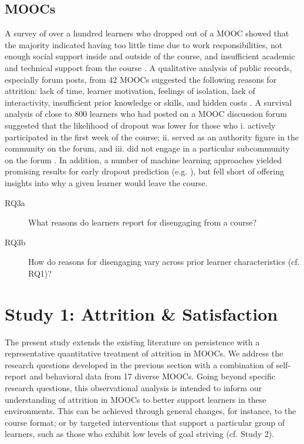 \documentclass{sigchi}\usepackage[]{graphicx}\usepackage[]{color}
\begin{document}
\subsection{MOOCs}

A survey of over a hundred learners who dropped out of a MOOC showed that the majority indicated having too little time due to work responsibilities, not enough social support inside and outside of the course, and insufficient academic and technical support from the course \cite{gutl2014attrition}. A qualitative analysis of public records, especially forum posts, from 42 MOOCs suggested the following reasons for attrition: lack of time, learner motivation, feelings of isolation, lack of interactivity, insufficient prior knowledge or skills, and hidden costs \cite{khalil2014moocs}. A survival analysis of close to 800 learners who had posted on a MOOC discussion forum suggested that the likelihood of dropout was lower for those who i. actively participated in the first week of the course; ii. served as an authority figure in the community on the forum, and iii. did not engage in a particular subcommunity on the forum \cite{yang2013turn}. In addition, a number of machine learning approaches yielded promising results for early dropout prediction (e.g. \cite{taylor2014likely,halawa2014dropout}), but fell short of offering insights into why a given learner would leave the course.

\begin{description}
\item[RQ3a] What reasons do learners report for disengaging from a course?
\item[RQ3b] How do reasons for disengaging vary across prior learner characteristics (cf. RQ1)?
\end{description}  

\section{Study 1: Attrition \& Satisfaction}

The present study extends the existing literature on persistence with a representative quantitative treatment of attrition in MOOCs. We address the research questions developed in the previous section with a combination of self-report and behavioral data from 17 diverse MOOCs. Going beyond specific research questions, this observational analysis is intended to inform our understanding of attrition in MOOCs to better support learners in these environments. This can be achieved through general changes, for instance, to the course format; or by targeted interventions that support a particular group of learners, such as those who exhibit low levels of goal striving (cf. Study 2).
\end{document}

